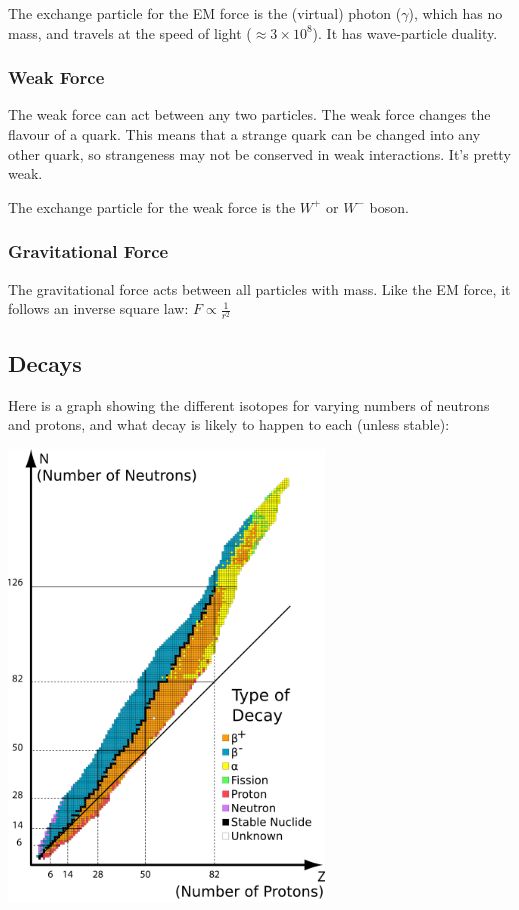 \documentclass[a4paper, 12pt]{article}
\begin{document}
The exchange particle for the EM force is the (virtual) photon ($\gamma$), which has no mass, and travels at the speed of light ($\approx 3 \times 10^8$). It has wave-particle duality.

\subsubsection{Weak Force}

The weak force can act between any two particles. The weak force changes the flavour of a quark. This means that a strange quark can be changed into any other quark, so strangeness may not be conserved in weak interactions. It's pretty weak.

The exchange particle for the weak force is the $W^+$ or $W^-$ boson.

\subsubsection{Gravitational Force}

The gravitational force acts between all particles with mass. Like the EM force, it follows an inverse square law: $F \propto \frac{1}{r^2}$

\subsection{Decays}

Here is a graph showing the different isotopes for varying numbers of neutrons and protons, and what decay is likely to happen to each (unless stable):

\begin{center}
\includegraphics[height=12cm]{bandOfStability.png}
\end{center}
\end{document}
